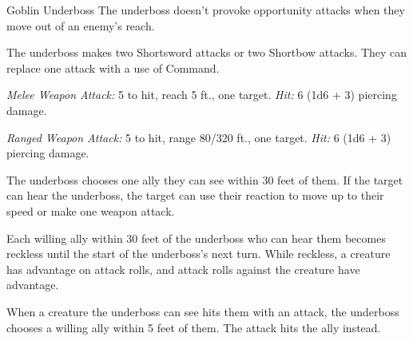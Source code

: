 \documentclass[10pt,a4paper,twoside,bg=print,twocolumn,openany,nodeprecatedcode]{dndbook}
\begin{document}
\begin{DndMonster}[float=t]{Goblin Underboss}
\DndMonsterBasics[
armor-class = {17 (studded leather armor)},
hit-points = {\DndDice{8d6 + 8}},
speed = {30 ft., climb 20 ft.}
]
\DndMonsterAbilityScores[
 str = 10,
 dex = 16,
 con = 13,
 int = 12,
 wis = 12,
 cha = 10
]
\DndMonsterDetails[
saving-throws = {Dex +5, Wis +3},
skills = {Insight +3, Intimidation +2, Stealth +5},
senses = {darkvision 60 ft., passive perception 11},
languages = {Common, Goblin},
challenge = 2,
]
The underboss doesn't provoke opportunity attacks when they move out of an enemy's reach.

The underboss makes two Shortsword attacks or two Shortbow attacks. They can replace one attack with a use of Command.

\textsl{Melee Weapon Attack:} 5 to hit, reach 5 ft., one target. \textsl{Hit:} 6 (1d6 + 3) piercing damage.

\textsl{Ranged Weapon Attack:} 5 to hit, range 80/320 ft., one target. \textsl{Hit:} 6 (1d6 + 3) piercing damage.

The underboss chooses one ally they can see within 30 feet of them. If the target can hear the underboss, the target can use their reaction to move up to their speed or make one weapon attack.

Each willing ally within 30 feet of the underboss who can hear them becomes reckless until the start of the underboss's next turn. While reckless, a creature has advantage on attack rolls, and attack rolls against the creature have advantage.

When a creature the underboss can see hits them with an attack, the underboss chooses a willing ally within 5 feet of them. The attack hits the ally instead.

\end{DndMonster}
\end{document}
